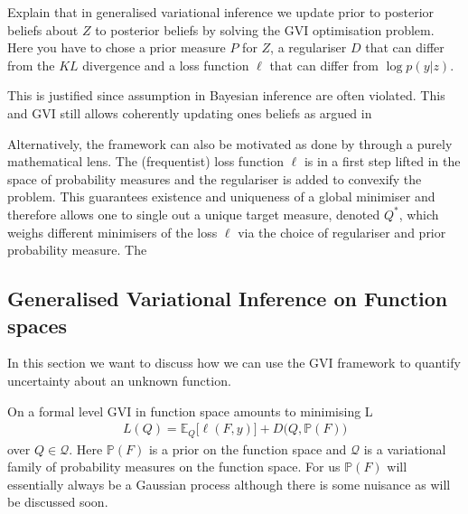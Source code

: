 \documentclass{article}
\newcommand{\bbP}{\mathbb{P}}
\newcommand{\bbE}{\mathbb{E}}
\newcommand{\calQ}{\mathcal{Q}}
\numberwithin{equation}{section}
\begin{document}
Explain that in generalised variational inference we update prior to posterior beliefs about $Z$ to posterior beliefs  by solving the GVI optimisation problem. Here you have to chose a prior measure $P$ for $Z$, a regulariser $D$ that can differ from the $KL$ divergence and a loss function $\ell$ that can differ from $\log p(y|z)$.

This is justified since assumption in Bayesian inference are often violated. This and GVI still allows coherently updating ones beliefs as argued in \citet{knoblauch2022optimization}

Alternatively, the framework can also be motivated as done by \citet{wild2023rigorous} through a purely mathematical lens. The (frequentist) loss function $\ell$ is in a first step lifted in the space of probability measures and the regulariser is added to convexify the problem. This guarantees existence and uniqueness of a global minimiser and therefore allows one to single out a unique target measure, denoted $Q^*$, which weighs different minimisers of the loss $\ell$ via the choice of regulariser and prior probability measure. The 

\subsection{Generalised Variational Inference on Function spaces}
In this section we want to discuss how we can use the GVI framework to quantify uncertainty about an unknown function. 

On a formal level GVI in function space amounts to minimising  L
\begin{align}
    L(Q) = \bbE_Q  \big[ \ell(F,y) \big] + D \big(Q, \bbP(F) \big)
\end{align}
over $Q \in \calQ$. Here $\bbP(F)$ is a prior on the function space and $\calQ$ is a variational family of probability measures on the function space. For us $\bbP(F)$ will essentially always be a Gaussian process although there is some nuisance as will be discussed soon. 
\end{document}
